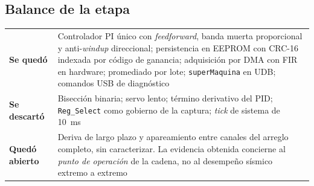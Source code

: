 
\subsection{Balance de la etapa}

\begin{center}\small
\begin{tabularx}{\textwidth}{@{}l X@{}}
\toprule
\textbf{Se qued\'o} & Controlador PI \'unico con \emph{feedforward}, banda muerta proporcional y anti-\emph{windup} direccional; persistencia en EEPROM con CRC-16 indexada por c\'odigo de ganancia; adquisici\'on por DMA con FIR en hardware; promediado por lote; \texttt{superMaquina} en UDB; comandos USB de diagn\'ostico \\
\addlinespace[3pt]
\textbf{Se descart\'o} & Bisecci\'on binaria; servo lento; t\'ermino derivativo del PID; \texttt{Reg\_Select} como gobierno de la captura; \emph{tick} de sistema de \SI{10}{\milli\second} \\
\addlinespace[3pt]
\textbf{Qued\'o abierto} & Deriva de largo plazo y apareamiento entre canales del arreglo completo, sin caracterizar. La evidencia obtenida concierne al \emph{punto de operaci\'on} de la cadena, no al desempe\~no s\'ismico extremo a extremo \\
\bottomrule
\end{tabularx}
\end{center}
